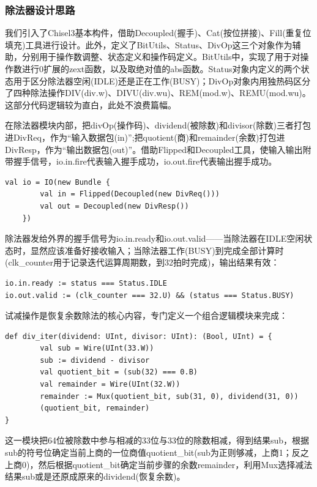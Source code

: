 \documentclass[11pt]{article}
\begin{document}
\subsubsection{除法器设计思路}

我们引入了Chisel3基本构件，借助Decoupled(握手)、Cat(按位拼接)、Fill(重复位填充)工具进行设计。此外，定义了BitUtils、Status、DivOp这三个对象作为辅助，分别用于操作数调整、状态定义和操作码定义。BitUtils中，实现了用于对操作数进行0扩展的zext函数，以及取绝对值的abs函数。Status对象内定义的两个状态用于区分除法器空闲(IDLE)还是正在工作(BUSY)；DivOp对象内用独热码区分了四种除法操作DIV(div.w)、DIVU(div.wu)、REM(mod.w)、REMU(mod.wu)。这部分代码逻辑较为直白，此处不浪费篇幅。



在除法器模块内部，把divOp(操作码)、dividend(被除数)和divisor(除数)三者打包进DivReq，作为“输入数据包(in)”;把quotient(商)和remainder(余数)打包进DivResp，作为“输出数据包(out)”。借助Flipped和Decoupled工具，使输入输出附带握手信号，io.in.fire代表输入握手成功，io.out.fire代表输出握手成功。
\begin{lstlisting}[language=Chisel, caption={IO接口}]
val io = IO(new Bundle {
        val in = Flipped(Decoupled(new DivReq()))
        val out = Decoupled(new DivResp())
    })
\end{lstlisting}

除法器发给外界的握手信号为io.in.ready和io.out.valid——当除法器在IDLE空闲状态时，显然应该准备好接收输入；当除法器工作(BUSY)到完成全部计算时(clk_counter用于记录迭代运算周期数，到32拍时完成)，输出结果有效：

\begin{lstlisting}[language=Chisel, caption={除法器发向外部的握手信号}]
io.in.ready := status === Status.IDLE
io.out.valid := (clk_counter === 32.U) && (status === Status.BUSY) 
\end{lstlisting}


试减操作是恢复余数除法的核心内容，专门定义一个组合逻辑模块来完成：
\begin{lstlisting}[language=Chisel, caption={试减模块(div_iter)}]
def div_iter(dividend: UInt, divisor: UInt): (Bool, UInt) = {
        val sub = Wire(UInt(33.W))
        sub := dividend - divisor
        val quotient_bit = (sub(32) === 0.B)
        val remainder = Wire(UInt(32.W))
        remainder := Mux(quotient_bit, sub(31, 0), dividend(31, 0))
        (quotient_bit, remainder)
}
\end{lstlisting}
这一模块把64位被除数中参与相减的33位与33位的除数相减，得到结果sub，根据sub的符号位确定当前上商的一位商值quotient_bit(sub为正则够减，上商1；反之上商0)，然后根据quotient_bit确定当前步骤的余数remainder，利用Mux选择减法结果sub或是还原成原来的dividend(恢复余数)。
\end{document}
